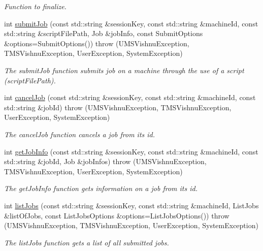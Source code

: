 \begin{DoxyCompactItemize}
\begin{DoxyCompactList}\small\item\em Function to finalize. \item\end{DoxyCompactList}\item 
int \hyperlink{namespacevishnu_acee6838fcf107a7a9b2f058159b7b9be}{submitJob} (const std::string \&sessionKey, const std::string \&machineId, const std::string \&scriptFilePath, Job \&jobInfo, const SubmitOptions \&options=SubmitOptions())  throw (UMSVishnuException, TMSVishnuException, UserException, SystemException)
\begin{DoxyCompactList}\small\item\em The submitJob function submits job on a machine through the use of a script (scriptFilePath). \item\end{DoxyCompactList}\item 
int \hyperlink{namespacevishnu_a151ba595af88d89107ff08ad0e2c5e31}{cancelJob} (const std::string \&sessionKey, const std::string \&machineId, const std::string \&jobId)  throw (UMSVishnuException, TMSVishnuException, UserException, SystemException)
\begin{DoxyCompactList}\small\item\em The cancelJob function cancels a job from its id. \item\end{DoxyCompactList}\item 
int \hyperlink{namespacevishnu_a4461c3e9d86e9c507436655056a1b660}{getJobInfo} (const std::string \&sessionKey, const std::string \&machineId, const std::string \&jobId, Job \&jobInfos)  throw (UMSVishnuException, TMSVishnuException, UserException, SystemException)
\begin{DoxyCompactList}\small\item\em The getJobInfo function gets information on a job from its id. \item\end{DoxyCompactList}\item 
int \hyperlink{namespacevishnu_a8e73e05d9006bd3e0388234ccf861538}{listJobs} (const std::string \&sessionKey, const std::string \&machineId, ListJobs \&listOfJobs, const ListJobsOptions \&options=ListJobsOptions())  throw (UMSVishnuException, TMSVishnuException, UserException, SystemException)
\begin{DoxyCompactList}\small\item\em The listJobs function gets a list of all submitted jobs. \item\end{DoxyCompactList}\item 

\end{DoxyCompactItemize}
